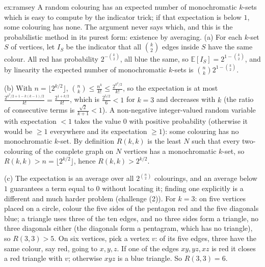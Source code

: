 \begin{solution}{ex:ramsey}
\idea A random colouring has an expected number of monochromatic $k$-sets which is easy to compute by the indicator trick; if that expectation is below $1$, some colouring has none. The argument never says which, and this is the probabilistic method in its purest form: existence by averaging.
\writeup (a) For each $k$-set $S$ of vertices, let $I_S$ be the indicator that all $\binom k2$ edges inside $S$ have the same colour. All red has probability $2^{-\binom k2}$, all blue the same, so $\mathbb E[I_S]=2^{1-\binom k2}$, and by linearity the expected number of monochromatic $k$-sets is $\binom nk2^{1-\binom k2}$.

(b) With $n=\lfloor2^{k/2}\rfloor$, $\binom nk\le\frac{n^k}{k!}\le\frac{2^{k^2/2}}{k!}$, so the expectation is at most $\frac{2^{k^2/2+1-k(k-1)/2}}{k!}=\frac{2^{1+k/2}}{k!}$, which is $\frac{2^{5/2}}6<1$ for $k=3$ and decreases with $k$ (the ratio of consecutive terms is $\frac{\sqrt2}{k+1}<1$). A non-negative integer-valued random variable with expectation $<1$ takes the value $0$ with positive probability (otherwise it would be $\ge1$ everywhere and its expectation $\ge1$): some colouring has no monochromatic $k$-set. By definition $R(k,k)$ is the least $N$ such that every two-colouring of the complete graph on $N$ vertices has a monochromatic $k$-set, so $R(k,k)>n=\lfloor2^{k/2}\rfloor$, hence $R(k,k)>2^{k/2}$.

(c) The expectation is an average over all $2^{\binom n2}$ colourings, and an average below $1$ guarantees a term equal to $0$ without locating it; finding one explicitly is a different and much harder problem (challenge (2)). For $k=3$: on five vertices placed on a circle, colour the five sides of the pentagon red and the five diagonals blue; a triangle uses three of the ten edges, and no three sides form a triangle, no three diagonals either (the diagonals form a pentagram, which has no triangle), so $R(3,3)>5$. On six vertices, pick a vertex $v$: of its five edges, three have the same colour, say red, going to $x,y,z$. If one of the edges $xy,yz,xz$ is red it closes a red triangle with $v$; otherwise $xyz$ is a blue triangle. So $R(3,3)=6$.
\end{solution}

